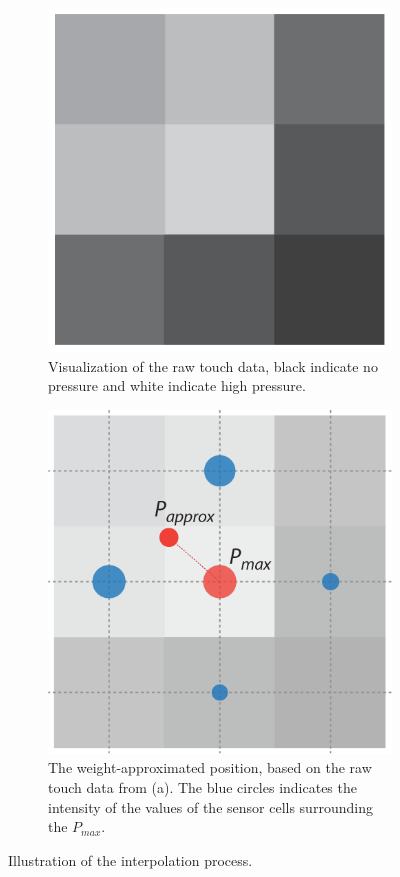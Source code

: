 

\begin{figure}[h]
\centering
\begin{subfigure}[t]{.45\textwidth}
  \centering
  \includegraphics[width=.9\linewidth]{figures/touch/p_map}
  \caption{Visualization of the raw touch data, black indicate no pressure and white indicate high pressure.}
\end{subfigure}%
\hspace{0.5cm}
\begin{subfigure}[t]{.45\textwidth}
  \centering
  \includegraphics[width=.9\linewidth]{figures/touch/p_approximation}
  \caption{The weight-approximated position, based on the raw touch data from (a). The blue circles indicates the intensity of the values of the sensor cells surrounding the \(P_{max}\).}
\end{subfigure}
\caption{Illustration of the interpolation process.}
\label{interpolation}
\end{figure}


